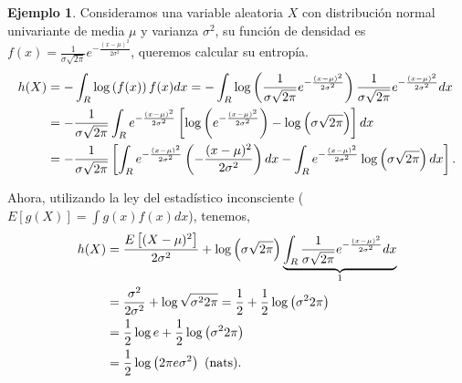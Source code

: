 \documentclass[10pt,a4paper]{article} %
\let\mathbb\relax
\theoremstyle{definition}
\newtheorem{definition}{Definición}[section]
\newtheorem{example}[theorem]{Ejemplo}
\begin{document}
\begin{example}\label{ej:norm_uni}
  Consideramos una variable aleatoria $X$ con distribución normal univariante de media $\mu$ y varianza $\sigma^2$, su función de densidad es $f(x) = \frac{1}{\sigma \sqrt{2\pi}} e ^{-\frac{(x-\mu)^2}{2\sigma ^2}}$, queremos calcular su entropía.
  \begin{align*}
    h(X) &= - \int_{\mathbb{R}} \log \left(f(x)\right) f(x)  dx = - \int_{\mathbb{R}}  \log \left ( \frac{1}{\sigma \sqrt{2\pi}} e ^{-\frac{(x-\mu)^2}{2\sigma ^2}} \right ) \frac{1}{\sigma \sqrt{2\pi}} e ^{-\frac{(x-\mu)^2}{2\sigma ^2}}dx\\
    &= -  \frac{1}{\sigma \sqrt{2\pi}} \int_{\mathbb{R}} e ^{-\frac{(x-\mu)^2}{2\sigma ^2}} \left [ \log \left ( e ^{-\frac{(x-\mu)^2}{2\sigma ^2}} \right ) - \log \left(\sigma \sqrt{2\pi}\right ) \right ] dx\\
    &= -  \frac{1}{\sigma \sqrt{2\pi}}\left [ \int_{\mathbb{R}} e ^{-\frac{(x-\mu)^2}{2\sigma ^2}} \left ( -\frac{(x-\mu)^2}{2\sigma ^2} \right )dx - \int_{\mathbb{R}} e ^{-\frac{(x-\mu)^2}{2\sigma ^2}} \log \left ( \sigma \sqrt{2\pi}\right ) dx \right ].\\
  \end{align*}

  Ahora, utilizando la ley del estadístico inconsciente ($E[g(X)]=  \int g(x)f(x)dx$), tenemos,
  \begingroup
\allowdisplaybreaks
  \begin{align*}
    h(X) &= \frac{\mathbb{E}\left [ (X-\mu) ^2\right ] }{2\sigma^2} + \log\left( \sigma\sqrt{2\pi} \right )\underbrace{\int_{\mathbb{R}} \frac{1}{\sigma\sqrt{2\pi}}e ^{-\frac{(x-\mu)^2}{2\sigma ^2}}dx}_{1}\\
    &= \frac{\sigma^2}{2\sigma^2} + \log \sqrt{\sigma^2 2 \pi} = \frac{1}{2} + \frac{1}{2}\log\left(  \sigma^2 2 \pi\right)\\
    &= \frac{1}{2} \log e + \frac{1}{2} \log\left( \sigma^2 2 \pi\right)\\ &= \frac{1}{2}\log\left({2\pi e\sigma^2} \right) \text{ (nats).}\\
  \end{align*}
  \endgroup
  
\end{example}

\end{document}
